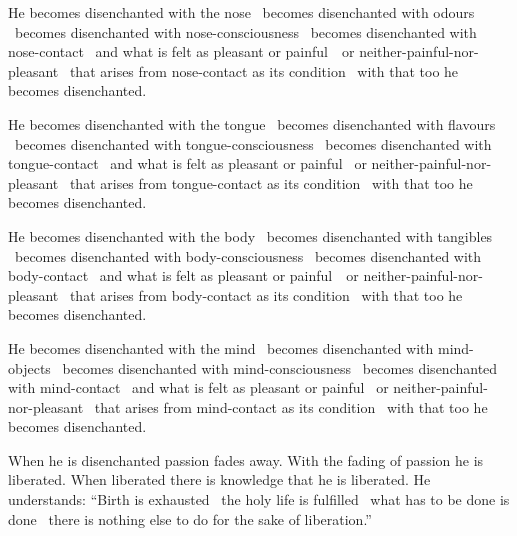 \begin{english-only-hang}
  He becomes disenchanted with the nose \breathmark\ becomes disenchanted with odours \breathmark\ becomes disenchanted with nose-consciousness \breathmark\ becomes disenchanted with nose-contact \breathmark\ and what is felt as pleasant or \mbox{painful}~\breathmark\ or neither-painful-nor-pleasant \breathmark\ that arises from nose-contact as its condition \breathmark\ with that too he becomes disenchanted.
\end{english-only-hang}

\begin{english-only-hang}
  He becomes disenchanted with the tongue \breathmark\ becomes disenchanted with flavours \breathmark\ becomes disenchanted with tongue-consciousness \breathmark\ becomes disenchanted with tongue-contact \breathmark\ and what is felt as pleasant or painful \breathmark\ or neither-painful-nor-pleasant \breathmark\ that arises from tongue-contact as its condition \breathmark\ with that too he becomes disenchanted.
\end{english-only-hang}

\begin{english-only-hang}
  He becomes disenchanted with the body \breathmark\ becomes disenchanted with tangibles \breathmark\ becomes disenchanted with body-consciousness \breathmark\ becomes disenchanted with body-contact \breathmark\ and what is felt as pleasant or \mbox{painful}~\breathmark\ or neither-painful-nor-pleasant \breathmark\ that arises from body-contact as its condition \breathmark\ with that too he becomes disenchanted.
\end{english-only-hang}

\begin{english-only-hang}
  He becomes disenchanted with the mind \breathmark\ becomes disenchanted with mind-objects \breathmark\ becomes disenchanted with mind-consciousness \breathmark\ becomes disenchanted with mind-contact \breathmark\ and what is felt as pleasant or painful \breathmark\ or neither-painful-nor-pleasant \breathmark\ that arises from mind-contact as its condition \breathmark\ with that too he becomes disenchanted.
\end{english-only-hang}

\begin{english-only-hang}
  When he is disenchanted passion fades away. With the fading of passion he is liberated. When liberated there is knowledge that he is liberated. He understands: ``Birth is exhausted \breathmark\ the holy life is fulfilled \breathmark\ what has to be done is done \breathmark\ there is nothing else to do for the sake of liberation.''
\end{english-only-hang}

